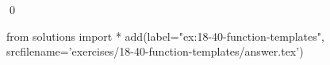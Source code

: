 
\begin{ex}
  \label{ex:18-40-function-templates}
  
  \qed
\end{ex}
\begin{python0}
from solutions import *
add(label="ex:18-40-function-templates",
    srcfilename='exercises/18-40-function-templates/answer.tex')
\end{python0}
